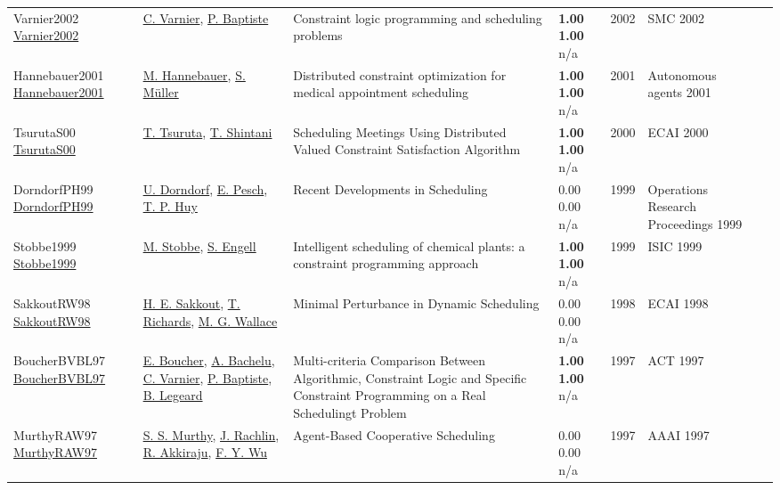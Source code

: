 {\begin{longtable}{p{3cm}p{5cm}p{10cm}p{1cm}rp{2.5cm}l}
Varnier2002 \href{http://dx.doi.org/10.1109/icsmc.1996.561432}{Varnier2002} & \hyperref[auth:a1680]{C. Varnier}, \hyperref[auth:a1681]{P. Baptiste} & Constraint logic programming and scheduling problems & \noindent{}\textbf{1.00} \textbf{1.00} n/a & 2002 & SMC 2002 & \cite{Varnier2002}\\
Hannebauer2001 \href{http://dx.doi.org/10.1145/375735.376026}{Hannebauer2001} & \hyperref[auth:a1925]{M. Hannebauer}, \hyperref[auth:a1926]{S. Müller} & Distributed constraint optimization for medical appointment scheduling & \noindent{}\textbf{1.00} \textbf{1.00} n/a & 2001 & Autonomous agents 2001 & \cite{Hannebauer2001}\\
TsurutaS00 \href{}{TsurutaS00} & \hyperref[auth:a1266]{T. Tsuruta}, \hyperref[auth:a1267]{T. Shintani} & Scheduling Meetings Using Distributed Valued Constraint Satisfaction Algorithm & \noindent{}\textbf{1.00} \textbf{1.00} n/a & 2000 & ECAI 2000 & \cite{TsurutaS00}\\
DorndorfPH99 \href{http://dx.doi.org/10.1007/978-3-642-58409-1_35}{DorndorfPH99} & \hyperref[auth:a904]{U. Dorndorf}, \hyperref[auth:a438]{E. Pesch}, \hyperref[auth:a905]{T. P. Huy} & Recent Developments in Scheduling & \noindent{}\textcolor{black!50}{0.00} \textcolor{black!50}{0.00} n/a & 1999 & Operations Research Proceedings 1999 & \cite{DorndorfPH99}\\
Stobbe1999 \href{http://dx.doi.org/10.1109/isic.1999.796662}{Stobbe1999} & \hyperref[auth:a2036]{M. Stobbe}, \hyperref[auth:a2037]{S. Engell} & Intelligent scheduling of chemical plants: a constraint programming approach & \noindent{}\textbf{1.00} \textbf{1.00} n/a & 1999 & ISIC 1999 & \cite{Stobbe1999}\\
SakkoutRW98 \href{}{SakkoutRW98} & \hyperref[auth:a166]{H. E. Sakkout}, \hyperref[auth:a1265]{T. Richards}, \hyperref[auth:a117]{M. G. Wallace} & Minimal Perturbance in Dynamic Scheduling & \noindent{}\textcolor{black!50}{0.00} \textcolor{black!50}{0.00} n/a & 1998 & ECAI 1998 & \cite{SakkoutRW98}\\
BoucherBVBL97 \href{}{BoucherBVBL97} & \hyperref[auth:a690]{E. Boucher}, \hyperref[auth:a691]{A. Bachelu}, \hyperref[auth:a692]{C. Varnier}, \hyperref[auth:a693]{P. Baptiste}, \hyperref[auth:a694]{B. Legeard} & Multi-criteria Comparison Between Algorithmic, Constraint Logic and Specific Constraint Programming on a Real Schedulingt Problem & \noindent{}\textbf{1.00} \textbf{1.00} n/a & 1997 & ACT 1997 & \cite{BoucherBVBL97}\\
MurthyRAW97 \href{}{MurthyRAW97} & \hyperref[auth:a1310]{S. S. Murthy}, \hyperref[auth:a1311]{J. Rachlin}, \hyperref[auth:a1312]{R. Akkiraju}, \hyperref[auth:a1313]{F. Y. Wu} & Agent-Based Cooperative Scheduling & \noindent{}\textcolor{black!50}{0.00} \textcolor{black!50}{0.00} n/a & 1997 & AAAI 1997 & \cite{MurthyRAW97}\\

\end{longtable}}
